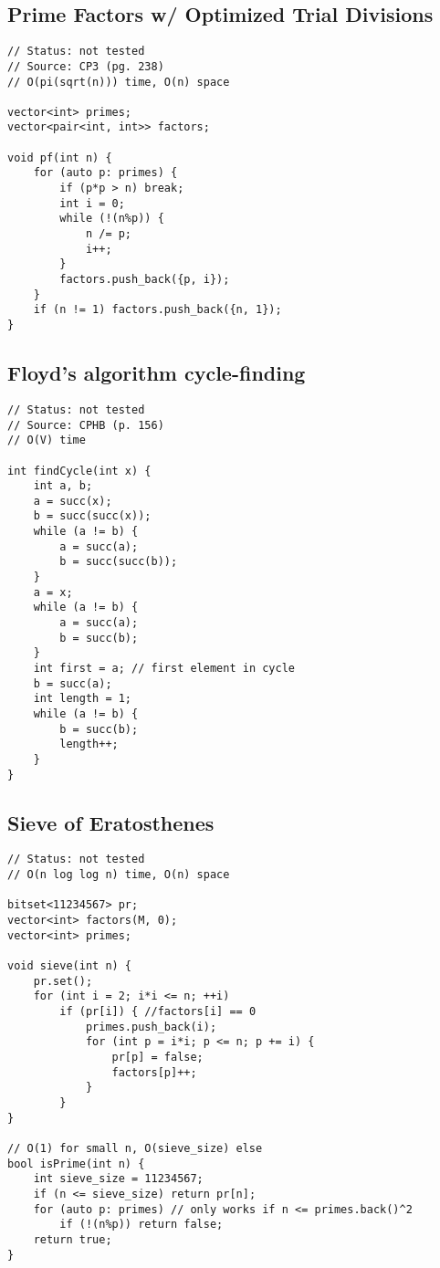 \documentclass[12pt, a4paper, twoside]{article}
\begin{document}
\subsection{Prime Factors w/ Optimized Trial Divisions}
\begin{lstlisting}
// Status: not tested
// Source: CP3 (pg. 238)
// O(pi(sqrt(n))) time, O(n) space

vector<int> primes;
vector<pair<int, int>> factors;

void pf(int n) {
	for (auto p: primes) {
		if (p*p > n) break;
		int i = 0;
		while (!(n%p)) {
			n /= p;
			i++;
		}
		factors.push_back({p, i});
	}
	if (n != 1) factors.push_back({n, 1});
}
\end{lstlisting}

\subsection{Floyd's algorithm cycle-finding}
\begin{lstlisting}
// Status: not tested
// Source: CPHB (p. 156)
// O(V) time

int findCycle(int x) {
	int a, b;
	a = succ(x);
	b = succ(succ(x));
	while (a != b) {
		a = succ(a);
		b = succ(succ(b));
	}
	a = x;
	while (a != b) {
		a = succ(a);
		b = succ(b);
	}
	int first = a; // first element in cycle
	b = succ(a);
	int length = 1;
	while (a != b) {
		b = succ(b);
		length++;
	}
}
\end{lstlisting}

\subsection{Sieve of Eratosthenes}
\begin{lstlisting}
// Status: not tested
// O(n log log n) time, O(n) space

bitset<11234567> pr;
vector<int> factors(M, 0);
vector<int> primes;

void sieve(int n) {
	pr.set();
	for (int i = 2; i*i <= n; ++i)
		if (pr[i]) { //factors[i] == 0
			primes.push_back(i);
			for (int p = i*i; p <= n; p += i) {
				pr[p] = false;
				factors[p]++;
			}
		}
}

// O(1) for small n, O(sieve_size) else
bool isPrime(int n) {
	int sieve_size = 11234567;
	if (n <= sieve_size) return pr[n];
	for (auto p: primes) // only works if n <= primes.back()^2
		if (!(n%p)) return false;
	return true;
}
\end{lstlisting}


\end{document}
